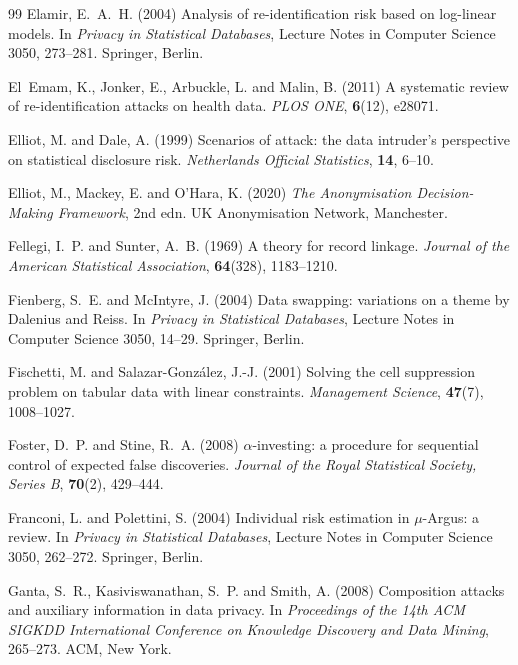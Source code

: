 \documentclass[11pt,a4paper]{article}
\theoremstyle{plain}
\theoremstyle{definition}
\begin{document}
\begin{thebibliography}{99}
Elamir, E.~A.~H. (2004) Analysis of re-identification risk based on log-linear
models. In \emph{Privacy in Statistical Databases}, Lecture Notes in Computer
Science 3050, 273--281. Springer, Berlin.

El~Emam, K., Jonker, E., Arbuckle, L. and Malin, B. (2011) A systematic review
of re-identification attacks on health data. \emph{PLOS ONE}, \textbf{6}(12),
e28071.

Elliot, M. and Dale, A. (1999) Scenarios of attack: the data intruder's
perspective on statistical disclosure risk. \emph{Netherlands Official
Statistics}, \textbf{14}, 6--10.

Elliot, M., Mackey, E. and O'Hara, K. (2020) \emph{The Anonymisation
Decision-Making Framework}, 2nd edn. UK Anonymisation Network, Manchester.

Fellegi, I.~P. and Sunter, A.~B. (1969) A theory for record linkage.
\emph{Journal of the American Statistical Association}, \textbf{64}(328),
1183--1210.

Fienberg, S.~E. and McIntyre, J. (2004) Data swapping: variations on a theme by
Dalenius and Reiss. In \emph{Privacy in Statistical Databases}, Lecture Notes
in Computer Science 3050, 14--29. Springer, Berlin.

Fischetti, M. and Salazar-Gonz\'alez, J.-J. (2001) Solving the cell suppression
problem on tabular data with linear constraints. \emph{Management Science},
\textbf{47}(7), 1008--1027.

Foster, D.~P. and Stine, R.~A. (2008) $\alpha$-investing: a procedure for
sequential control of expected false discoveries. \emph{Journal of the Royal
Statistical Society, Series B}, \textbf{70}(2), 429--444.

Franconi, L. and Polettini, S. (2004) Individual risk estimation in
$\mu$-Argus: a review. In \emph{Privacy in Statistical Databases}, Lecture
Notes in Computer Science 3050, 262--272. Springer, Berlin.

Ganta, S.~R., Kasiviswanathan, S.~P. and Smith, A. (2008) Composition attacks and
auxiliary information in data privacy. In \emph{Proceedings of the 14th ACM
SIGKDD International Conference on Knowledge Discovery and Data Mining},
265--273. ACM, New York.


\end{thebibliography}
\end{document}
